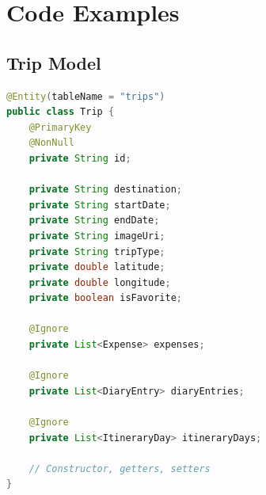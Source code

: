 \documentclass[12pt,a4paper]{article}
\begin{document}
\appendix

\section{Code Examples}

\subsection{Trip Model}
\begin{lstlisting}[language=Java, caption=Trip.java]
@Entity(tableName = "trips")
public class Trip {
    @PrimaryKey
    @NonNull
    private String id;

    private String destination;
    private String startDate;
    private String endDate;
    private String imageUri;
    private String tripType;
    private double latitude;
    private double longitude;
    private boolean isFavorite;

    @Ignore
    private List<Expense> expenses;

    @Ignore
    private List<DiaryEntry> diaryEntries;

    @Ignore
    private List<ItineraryDay> itineraryDays;

    // Constructor, getters, setters
}
\end{lstlisting}
\end{document}
